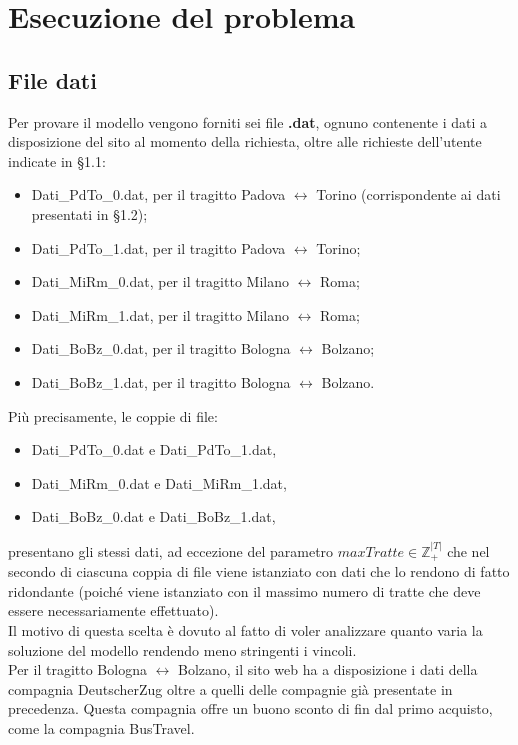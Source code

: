 \documentclass[main.tex]{subfiles}
\begin{document}
\section{Esecuzione del problema}
\subsection{File dati}
Per provare il modello vengono forniti sei file \textbf{.dat}, ognuno contenente i dati a disposizione del sito al momento della richiesta, oltre alle richieste
dell'utente indicate in §1.1:
\begin{itemize}
    \item Dati\_PdTo\_0.dat, per il tragitto Padova $\leftrightarrow$ Torino (corrispondente ai dati presentati in §1.2);
    \item Dati\_PdTo\_1.dat, per il tragitto Padova $\leftrightarrow$ Torino;
    \item Dati\_MiRm\_0.dat, per il tragitto Milano $\leftrightarrow$ Roma;
    \item Dati\_MiRm\_1.dat, per il tragitto Milano $\leftrightarrow$ Roma;
    \item Dati\_BoBz\_0.dat, per il tragitto Bologna $\leftrightarrow$ Bolzano;
    \item Dati\_BoBz\_1.dat, per il tragitto Bologna $\leftrightarrow$ Bolzano.
\end{itemize}
Più precisamente, le coppie di file:
\begin{itemize}
    \item Dati\_PdTo\_0.dat e Dati\_PdTo\_1.dat,
    \item Dati\_MiRm\_0.dat e Dati\_MiRm\_1.dat,
    \item Dati\_BoBz\_0.dat e Dati\_BoBz\_1.dat,
\end{itemize}
presentano gli stessi dati, ad eccezione del parametro $maxTratte \in \mathbb{Z}_+^{|T|}$ che nel secondo di ciascuna coppia di file viene istanziato 
con dati che lo rendono di fatto ridondante (poiché viene istanziato con il massimo numero di tratte che deve essere necessariamente effettuato).\\
Il motivo di questa scelta è dovuto al fatto di voler analizzare quanto varia la soluzione del modello rendendo meno stringenti i vincoli.\\
Per il tragitto Bologna $\leftrightarrow$ Bolzano, il sito web ha a disposizione i dati della compagnia DeutscherZug oltre a quelli delle compagnie già presentate in precedenza. 
Questa compagnia offre un buono sconto di  fin dal primo acquisto, come la compagnia BusTravel.
\end{document}
